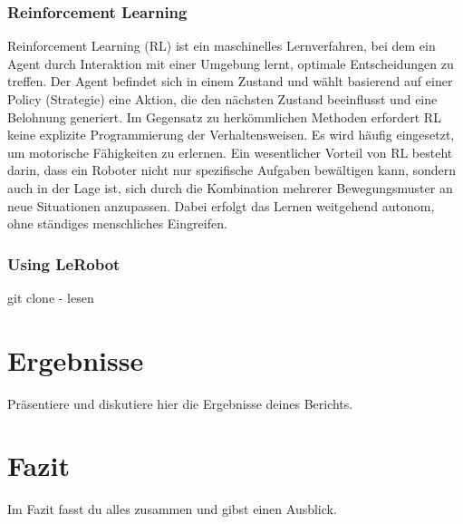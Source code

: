 \documentclass[a4paper, 12pt]{article}
\begin{document}
\subsubsection{Reinforcement Learning} \label{reinforcement_learning}
Reinforcement Learning (RL) ist ein maschinelles Lernverfahren, bei dem ein Agent durch Interaktion mit einer Umgebung lernt, optimale Entscheidungen zu treffen. Der Agent befindet sich in einem Zustand und wählt basierend auf einer Policy (Strategie) eine Aktion, die den nächsten Zustand beeinflusst und eine Belohnung generiert. Im Gegensatz zu herkömmlichen Methoden erfordert RL keine explizite Programmierung der Verhaltensweisen. Es wird häufig eingesetzt, um motorische Fähigkeiten zu erlernen. Ein wesentlicher Vorteil von RL besteht darin, dass ein Roboter nicht nur spezifische Aufgaben bewältigen kann, sondern auch in der Lage ist, sich durch die Kombination mehrerer Bewegungsmuster an neue Situationen anzupassen. Dabei erfolgt das Lernen weitgehend autonom, ohne ständiges menschliches Eingreifen. \cite{learning_motor_skills}

\subsubsection{Using LeRobot} \label{using_lerobot}
git clone
- lesen

\newpage
\section{Ergebnisse}
Präsentiere und diskutiere hier die Ergebnisse deines Berichts.

\newpage
\section{Fazit}
Im Fazit fasst du alles zusammen und gibst einen Ausblick.

\newpage


\end{document}
